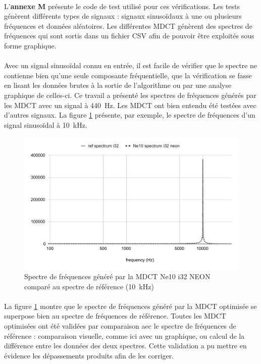 \documentclass{article}
\begin{document}
    \paragraph{}
    L'\textbf{annexe M} présente le code de test utilisé pour ces vérifications. Les tests génèrent différents types de signaux : signaux sinusoïdaux à une ou plusieurs fréquences et données aléatoires. Les différentes MDCT génèrent des spectres de fréquences qui sont sortis dans un fichier CSV afin de pouvoir être exploités sous forme graphique.

    \paragraph{}
    Avec un signal sinusoïdal connu en entrée, il est facile de vérifier que le spectre ne contienne bien qu'une seule composante fréquentielle, que la vérification se fasse en lisant les données brutes à la sortie de l'algorithme ou par une analyse graphique de celles-ci. Ce travail a présenté les spectres de fréquences générés par les MDCT avec un signal à \SI{440}{\hertz}. Les MDCT ont bien entendu été testées avec d'autres signaux. La figure \ref{fig:validation_ne10_i32_neon_10k} présente, par exemple, le spectre de fréquences d'un signal sinusoïdal à \SI{10}{\kilo\hertz}.
    \begin{figure}[H]
        \centering
        \includegraphics[width=.8\linewidth]{./images/validation_ne10_i32_neon_10k.pdf}
        \caption{Spectre de fréquences généré par la MDCT Ne10 i32 NEON comparé au spectre de référence (\SI{10}{\kilo\hertz})}
        \label{fig:validation_ne10_i32_neon_10k}
    \end{figure}

    \paragraph{}
    La figure \ref{fig:validation_ne10_i32_neon_10k} montre que le spectre de fréquences généré par la MDCT optimisée se superpose bien au spectre de fréquences de référence. Toutes les MDCT optimisées ont été validées par comparaison aec le spectre de fréquences de référence : comparaison visuelle, comme ici avec un graphique, ou calcul de la différence entre les données des deux spectres. Cette validation a pu mettre en évidence les dépassements produits afin de les corriger.
\end{document}
